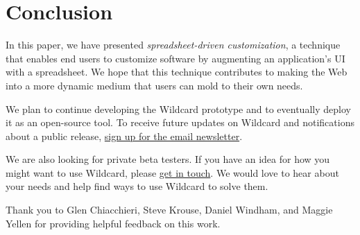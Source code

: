 \documentclass[english,submission]{programming}
\begin{document}
\hypertarget{conclusion}{%
\section{Conclusion}\label{conclusion}}

In this paper, we have presented \emph{spreadsheet-driven
customization}, a technique that enables end users to customize software
by augmenting an application's UI with a spreadsheet. We hope that this
technique contributes to making the Web into a more dynamic medium that
users can mold to their own needs.

We plan to continue developing the Wildcard prototype and to eventually
deploy it as an open-source tool. To receive future updates on Wildcard
and notifications about a public release, \href{}{sign up for the email
newsletter}.

We are also looking for private beta testers. If you have an idea for
how you might want to use Wildcard, please
\href{mailto:glitt@mit.edu}{get in touch}. We would love to hear about
your needs and help find ways to use Wildcard to solve them.

\acks
Thank you to Glen Chiacchieri, Steve Krouse, Daniel Windham, and Maggie
Yellen for providing helpful feedback on this work.

\printbibliography
\end{document}
